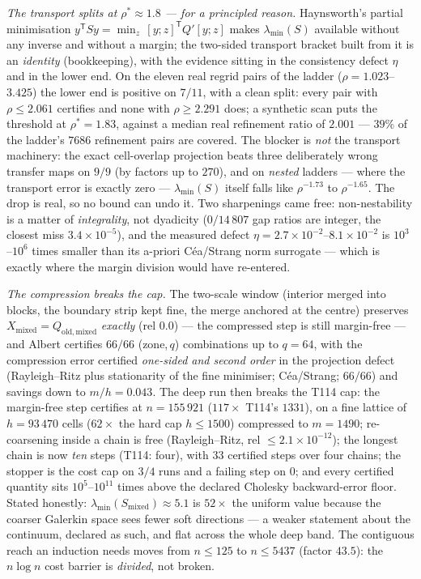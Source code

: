 \documentclass[11pt,a4paper]{article}
\begin{document}
\emph{The transport splits at $\rho^*\approx1.8$ --- for a principled reason.} Haynsworth's
partial minimisation $y^{\mathsf T}Sy=\min_z\,[y;z]^{\mathsf T}Q'[y;z]$ makes $\lambda_{\min}(S)$
available without any inverse and without a margin; the two-sided transport bracket built from it
is an \emph{identity} (bookkeeping), with the evidence sitting in the consistency defect $\eta$
and in the lower end. On the eleven real regrid pairs of the ladder ($\rho=1.023$--$3.425$) the
lower end is positive on $7/11$, with a clean split: every pair with $\rho\le2.061$ certifies and
none with $\rho\ge2.291$ does; a synthetic scan puts the threshold at $\rho^*=1.83$, against a
median real refinement ratio of $2.001$ --- $39\%$ of the ladder's $7686$ refinement pairs are
covered. The blocker is \emph{not} the transport machinery: the exact cell-overlap projection
beats three deliberately wrong transfer maps on $9/9$ (by factors up to $270$), and on
\emph{nested} ladders --- where the transport error is exactly zero --- $\lambda_{\min}(S)$
itself falls like $\rho^{-1.73}$ to $\rho^{-1.65}$. The drop is real, so no bound can undo it.
Two sharpenings came free: non-nestability is a matter of \emph{integrality}, not dyadicity
($0/14\,807$ gap ratios are integer, the closest miss $3.4\times10^{-5}$), and the measured
defect $\eta=2.7\times10^{-2}$--$8.1\times10^{-2}$ is $10^{3}$--$10^{6}$ times smaller than its
a-priori C\'ea/Strang norm surrogate --- which is exactly where the margin division would have
re-entered.

\emph{The compression breaks the cap.} The two-scale window (interior merged into blocks, the
boundary strip kept fine, the merge anchored at the centre) preserves
$X_{\mathrm{mixed}}=Q_{\mathrm{old,mixed}}$ \emph{exactly} (rel $0.0$) --- the compressed step is
still margin-free --- and Albert certifies $66/66$ (zone,\,$q$) combinations up to $q=64$, with
the compression error certified \emph{one-sided and second order} in the projection defect
(Rayleigh--Ritz plus stationarity of the fine minimiser; C\'ea/Strang; $66/66$) and savings down
to $m/h=0.043$. The deep run then breaks the T114 cap: the margin-free step certifies at
$n=155\,921$ ($117\times$ T114's $1331$), on a fine lattice of $h=93\,470$ cells ($62\times$ the
hard cap $h\le1500$) compressed to $m=1490$; re-coarsening inside a chain is free (Rayleigh--Ritz,
rel $\le2.1\times10^{-12}$); the longest chain is now \emph{ten} steps (T114: four), with $33$
certified steps over four chains; the stopper is the cost cap on $3/4$ runs and a failing step on
$0$; and every certified quantity sits $10^{5}$--$10^{11}$ times above the declared Cholesky
backward-error floor. Stated honestly: $\lambda_{\min}(S_{\mathrm{mixed}})\approx5.1$ is $52\times$
the uniform value because the coarser Galerkin space sees fewer soft directions --- a weaker
statement about the continuum, declared as such, and flat across the whole deep band. The
contiguous reach an induction needs moves from $n\le125$ to $n\le5437$ (factor $43.5$): the
$n\log n$ cost barrier is \emph{divided}, not broken.
\end{document}
